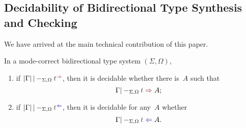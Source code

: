 
\subsection{Decidability of Bidirectional Type Synthesis and Checking}\label{subsec:bidirectional-synthesis-checking}

We have arrived at the main technical contribution of this paper.

\begin{theorem} \label{thm:bidirectional-type-synthesis-checking}
  In a mode-correct bidirectional type system $(\Sigma, \Omega)$,
  \begin{enumerate}
    \item if\/ $\erase{\Gamma} |-_{\Sigma, \Omega} \isTerm{t}^{\syn}$, then it is decidable whether there is~$A$ such that
      \[
        \Gamma |-_{\Sigma, \Omega} \isTerm{t} \syn A;
      \]
    \item if\/ $\erase{\Gamma} |-_{\Sigma, \Omega} \isTerm{t}^{\chk}$, then it is decidable for any~$A$ whether
      \[
        \Gamma |-_{\Sigma, \Omega} \isTerm{t} \chk A.
      \]
  \end{enumerate}
\end{theorem}

